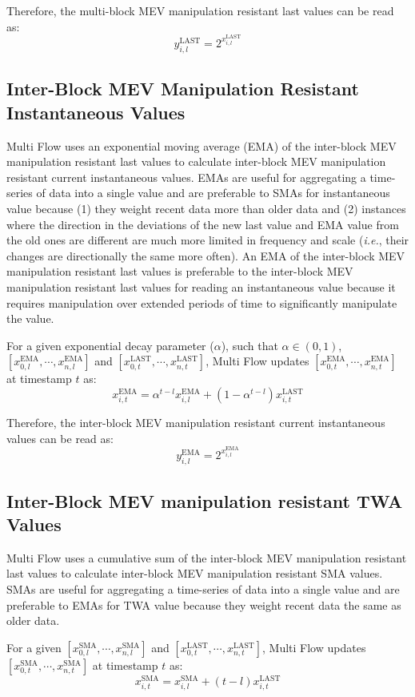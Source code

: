\documentclass[tikz]{article}
\begin{document}
Therefore, the multi-block MEV manipulation resistant last values can be read as: 
$$
y^{\text{LAST}}_{i,l} = 2^{x^{\text{LAST}}_{i,l}}
$$

\subsection{Inter-Block MEV Manipulation Resistant Instantaneous Values}
Multi Flow uses an exponential moving average (EMA) of the inter-block MEV manipulation resistant last values to calculate inter-block MEV manipulation resistant current instantaneous values. EMAs are useful for aggregating a time-series of data into a single value and are preferable to SMAs for instantaneous value because (1) they weight recent data more than older data and (2) instances where the direction in the deviations of the new last value and EMA value from the old ones are different are much more limited in frequency and scale (\textit{i.e.}, their changes are directionally the same more often). An EMA of the inter-block MEV manipulation resistant last values is preferable to the inter-block MEV manipulation resistant last values for reading an instantaneous value because it requires manipulation over extended periods of time to significantly manipulate the value.

For a given exponential decay parameter ($\alpha$), such that $\alpha \in (0,1)$, $[x^{\text{EMA}}_{0,l}, \cdots, x^{\text{EMA}}_{n,l}]$ and $[x^{\text{LAST}}_{0,t}, \cdots, x^{\text{LAST}}_{n,t}]$, Multi Flow updates $[x^{\text{EMA}}_{0,t}, \cdots, x^{\text{EMA}}_{n,t}]$ at timestamp $t$ as:
$$
x^{\text{EMA}}_{i,t} = \alpha^{t-l} x^{\text{EMA}}_{i,l} + (1 - \alpha^{t-l}) x^{\text{LAST}}_{i,t}
$$

Therefore, the inter-block MEV manipulation resistant current instantaneous values can be read as: 
$$
y^{\text{EMA}}_{i,l} = 2^{x^{\text{EMA}}_{i,l}}
$$

\subsection{Inter-Block MEV manipulation resistant TWA Values}
Multi Flow uses a cumulative sum of the inter-block MEV manipulation resistant last values to calculate inter-block MEV manipulation resistant SMA values. SMAs are useful for aggregating a time-series of data into a single value and are preferable to EMAs for TWA value because they weight recent data the same as older data.

For a given $[x^{\text{SMA}}_{0,l}, \cdots, x^{\text{SMA}}_{n,l}]$ and $[x^{\text{LAST}}_{0,t}, \cdots, x^{\text{LAST}}_{n,t}]$, Multi Flow updates $[x^{\text{SMA}}_{0,t}, \cdots, x^{\text{SMA}}_{n,t}]$ at timestamp $t$ as:
$$
x^{\text{SMA}}_{i,t} = x^{\text{SMA}}_{i,l} + (t-l) x^{\text{LAST}}_{i,t}
$$
\end{document}
